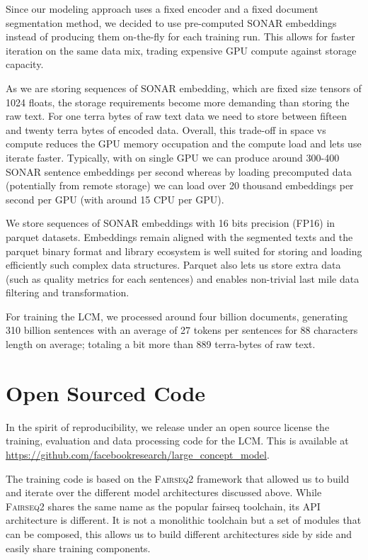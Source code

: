 \documentclass[twoside,11pt]{fairmeta}
\newcommand{\sonar}{\textsc{SONAR}\xspace}
\newcommand{\lcm}{\textsc{LCM}\xspace}
\newcommand{\meresgithub}{\url{https://github.com/facebookresearch/large_concept_model}}
\newcommand{\fairseq}{\textsc{Fairseq2}\xspace} %
\begin{document}
Since our modeling approach uses a fixed encoder and a
fixed document segmentation method, 
we decided to use pre-computed \sonar embeddings instead 
of producing them on-the-fly for each training run. This allows for faster iteration on the same data mix, trading expensive GPU compute against storage capacity.

As we are storing sequences of \sonar embedding, which are fixed size tensors of 1024 floats, the storage requirements become more demanding than storing the raw text. For one terra bytes of raw text data we need to store between fifteen and twenty terra bytes of encoded data.
Overall, this trade-off in space vs compute reduces the GPU memory occupation and the compute load and lets use iterate faster.
Typically, with on single GPU we can produce around 
300-400 \sonar sentence embeddings per second whereas 
by loading precomputed data (potentially from remote storage) 
we can load over 20 thousand embeddings per second per GPU (with around 15 CPU per GPU).

We store sequences of \sonar embeddings with 16 bits precision (FP16) in parquet datasets.
Embeddings remain aligned with the segmented texts and the
parquet binary format and library ecosystem is well suited for storing and loading efficiently such complex data structures. Parquet also lets us store extra data (such as quality metrics for each sentences) and enables non-trivial last mile data filtering and transformation.

For training the \lcm, we processed around four billion documents, generating 310 billion sentences with an average of 27 tokens per sentences for 88 characters length on average; totaling a bit more than 889 terra-bytes of raw text.\section{Open Sourced Code}

In the spirit of reproducibility, we release under an open source license the training, evaluation and data processing code for the \lcm. This is available at \meresgithub.

The training code is based on the \fairseq framework \citep{balioglu2023fairseq2} that allowed us to build and iterate over the different model architectures discussed above. While \fairseq shares the same name as the popular fairseq toolchain, its API architecture is different. It is not a monolithic toolchain but a set of modules that can be composed, this allows us to build different architectures side by side and easily share training components.
\end{document}
